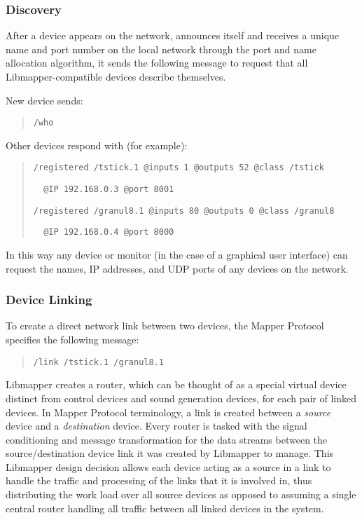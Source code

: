 \subsubsection{Discovery}

After a device appears on the network, announces itself and receives a unique name and port number on the local network through the port and name allocation algorithm, it sends the following message to request that all Libmapper-compatible devices describe themselves.

New device sends:

\begin{quote}
\verb#/who#
\end{quote}

Other devices respond with (for example):

\begin{quote}
\verb#/registered /tstick.1 @inputs 1 @outputs 52 @class /tstick# 

\verb#  @IP 192.168.0.3 @port 8001#

\verb#/registered /granul8.1 @inputs 80 @outputs 0 @class /granul8#

\verb#  @IP 192.168.0.4 @port 8000#
\end{quote}

In this way any device or monitor (in the case of a graphical user interface) can request the names, IP addresses, and UDP ports of any devices on the network. 

\subsubsection{Device Linking}

To create a direct network link between two devices, the Mapper Protocol specifies the following message:

\begin{quote}
\verb#/link /tstick.1 /granul8.1#
\end{quote}

Libmapper creates a router, which can be thought of as a special virtual device distinct from control devices and sound generation devices, for each pair of linked devices. In Mapper Protocol terminology, a link is created between a \emph{source} device and a \emph{destination} device. Every router is tasked with the signal conditioning and message transformation for the data streams between the source/destination device link it was created by Libmapper to manage. This Libmapper design decision allows each device acting as a source in a link to handle the traffic and processing of the links that it is involved in, thus distributing the work load over all source devices as opposed to assuming a single central router handling all traffic between all linked devices in the system.

